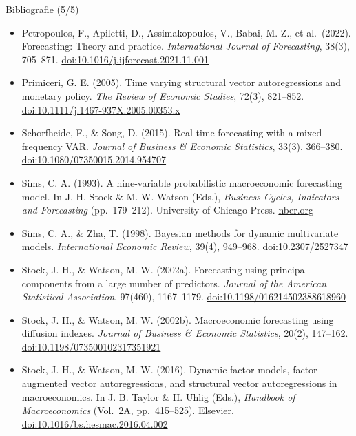 \begin{frame}{Bibliografie (5/5)}
\itemsize{\tiny}
\begin{itemize}
    \item Petropoulos, F., Apiletti, D., Assimakopoulos, V., Babai, M. Z., et al.\ (2022). Forecasting: Theory and practice. \textit{International Journal of Forecasting}, 38(3), 705--871. \href{https://doi.org/10.1016/j.ijforecast.2021.11.001}{doi:10.1016/j.ijforecast.2021.11.001}
    \item Primiceri, G. E. (2005). Time varying structural vector autoregressions and monetary policy. \textit{The Review of Economic Studies}, 72(3), 821--852. \href{https://doi.org/10.1111/j.1467-937X.2005.00353.x}{doi:10.1111/j.1467-937X.2005.00353.x}
    \item Schorfheide, F., \& Song, D. (2015). Real-time forecasting with a mixed-frequency VAR. \textit{Journal of Business \& Economic Statistics}, 33(3), 366--380. \href{https://doi.org/10.1080/07350015.2014.954707}{doi:10.1080/07350015.2014.954707}
    \item Sims, C. A. (1993). A nine-variable probabilistic macroeconomic forecasting model. In J. H. Stock \& M. W. Watson (Eds.), \textit{Business Cycles, Indicators and Forecasting} (pp.\ 179--212). University of Chicago Press. \href{https://www.nber.org/books-and-chapters/business-cycles-indicators-and-forecasting/nine-variable-probabilistic-macroeconomic-forecasting-model}{nber.org}
    \item Sims, C. A., \& Zha, T. (1998). Bayesian methods for dynamic multivariate models. \textit{International Economic Review}, 39(4), 949--968. \href{https://doi.org/10.2307/2527347}{doi:10.2307/2527347}
    \item Stock, J. H., \& Watson, M. W. (2002a). Forecasting using principal components from a large number of predictors. \textit{Journal of the American Statistical Association}, 97(460), 1167--1179. \href{https://doi.org/10.1198/016214502388618960}{doi:10.1198/016214502388618960}
    \item Stock, J. H., \& Watson, M. W. (2002b). Macroeconomic forecasting using diffusion indexes. \textit{Journal of Business \& Economic Statistics}, 20(2), 147--162. \href{https://doi.org/10.1198/073500102317351921}{doi:10.1198/073500102317351921}
    \item Stock, J. H., \& Watson, M. W. (2016). Dynamic factor models, factor-augmented vector autoregressions, and structural vector autoregressions in macroeconomics. In J. B. Taylor \& H. Uhlig (Eds.), \textit{Handbook of Macroeconomics} (Vol.\ 2A, pp.\ 415--525). Elsevier. \href{https://doi.org/10.1016/bs.hesmac.2016.04.002}{doi:10.1016/bs.hesmac.2016.04.002}

\end{itemize}
\end{frame}
